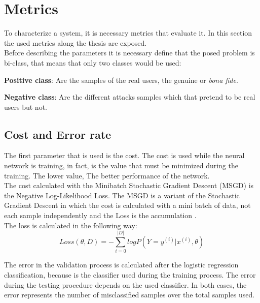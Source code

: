 \section{Metrics}
To characterize a system, it is necessary metrics that evaluate it. In this section the used metrics along the thesis are exposed.\\

Before describing the parameters it is necessary define that the posed problem is bi-class, that means that only two classes would be used:

\begin{description}
\item \textbf{Positive class}: Are the samples of the real users, the genuine or \textit{bona fide}.
\item \textbf{Negative class}: Are the different attacks samples which that pretend to be real users but not.
\end{description}

\subsection{Cost and Error rate}
The first parameter that is used is the cost. The cost is used while the neural network is training, in fact, is the value that must be minimized during the training. The lower value, The better performance of the network.\\

The cost calculated with the Minibatch Stochastic Gradient Descent (MSGD) is the Negative Log-Likelihood Loss. The MSGD is a variant of the Stochastic Gradient Descent in which the cost is calculated with a mini batch of data, not each sample independently and the Loss is the accumulation \cite{Stutz}.\\

The loss is calculated in the following way:\\

\begin{equation}
  Loss(\theta, D) = - \sum_{i=0}^{|D|}log P(Y = y^{(i)}|x^{(i)}, \theta)
\end{equation}

The error in the validation process is calculated after the logistic regression classification, because is the classifier used during the training process. The error during the testing procedure depends on the used classifier. In both cases, the error represents the number of misclassified samples over the total samples used.\\ 


